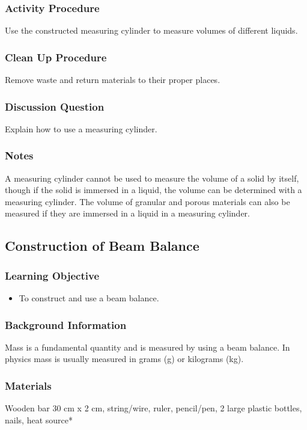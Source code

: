 \subsubsection*{Activity Procedure}
Use the constructed measuring cylinder to measure volumes of different liquids.

\subsubsection*{Clean Up Procedure}
Remove waste and return materials to their proper places.

\subsubsection*{Discussion Question}
Explain how to use a measuring cylinder.

\subsubsection*{Notes}
A measuring cylinder cannot be used to measure the volume of a solid by itself, though if the solid is immersed in a liquid, the volume can be determined with a measuring cylinder. The volume of granular and porous materials can also be measured if they are immersed in a liquid in a measuring cylinder.

\subsection{Construction of Beam Balance}
\label{sub:beambalance}

\subsubsection*{Learning Objective}
\begin{itemize}
\item{To construct and use a beam balance.} 
\end{itemize}

\subsubsection*{Background Information}
Mass is a fundamental quantity and is measured by using a beam balance. In physics mass is usually measured in grams (g) or kilograms (kg).

\subsubsection*{Materials}
Wooden bar 30 cm x 2 cm, string/wire, ruler, pencil/pen, 2 large plastic bottles, nails, heat source*

